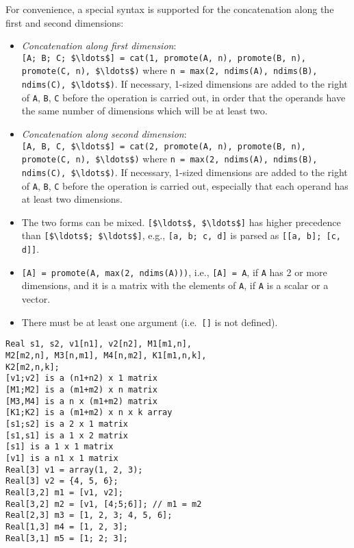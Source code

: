 For convenience, a special syntax is supported for the concatenation along the first and second dimensions:
\begin{itemize}
\item
  \emph{Concatenation along first dimension}:\\
  \lstinline![A; B; C; $\ldots$] = cat(1, promote(A, n), promote(B, n), promote(C, n), $\ldots$)! where \lstinline!n = max(2, ndims(A), ndims(B), ndims(C), $\ldots$)!.
  If necessary, 1-sized dimensions are added to the right of \lstinline!A!, \lstinline!B!, \lstinline!C! before the operation is carried out, in order that the operands have the same number of dimensions which will be at least two.
\item
  \emph{Concatenation along second dimension}:\\
  \lstinline![A, B, C, $\ldots$] = cat(2, promote(A, n), promote(B, n), promote(C, n), $\ldots$)! where \lstinline!n = max(2, ndims(A), ndims(B), ndims(C), $\ldots$)!.
  If necessary, 1-sized dimensions are added to the right of \lstinline!A!, \lstinline!B!, \lstinline!C! before the operation is carried out, especially that each operand has at least two dimensions.
\item
  The two forms can be mixed.
  \lstinline![$\ldots$, $\ldots$]! has higher precedence than \lstinline![$\ldots$; $\ldots$]!, e.g., \lstinline![a, b; c, d]! is parsed as \lstinline![[a, b]; [c, d]]!.
\item
  \lstinline![A] = promote(A, max(2, ndims(A)))!, i.e., \lstinline![A] = A!, if \lstinline!A! has 2 or more dimensions, and it is a matrix with the elements of \lstinline!A!, if \lstinline!A! is a scalar or a vector.
\item
  There must be at least one argument (i.e.\ \lstinline![]! is not defined).
\end{itemize}

\begin{example}
\begin{lstlisting}[language=modelica]
Real s1, s2, v1[n1], v2[n2], M1[m1,n],
M2[m2,n], M3[n,m1], M4[n,m2], K1[m1,n,k],
K2[m2,n,k];
[v1;v2] is a (n1+n2) x 1 matrix
[M1;M2] is a (m1+m2) x n matrix
[M3,M4] is a n x (m1+m2) matrix
[K1;K2] is a (m1+m2) x n x k array
[s1;s2] is a 2 x 1 matrix
[s1,s1] is a 1 x 2 matrix
[s1] is a 1 x 1 matrix
[v1] is a n1 x 1 matrix
Real[3] v1 = array(1, 2, 3);
Real[3] v2 = {4, 5, 6};
Real[3,2] m1 = [v1, v2];
Real[3,2] m2 = [v1, [4;5;6]]; // m1 = m2
Real[2,3] m3 = [1, 2, 3; 4, 5, 6];
Real[1,3] m4 = [1, 2, 3];
Real[3,1] m5 = [1; 2; 3];
\end{lstlisting}
\end{example}

